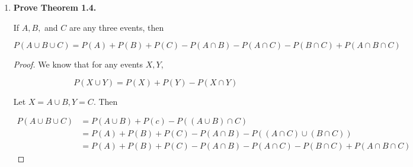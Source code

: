 \documentclass[10pt, oneside]{article}
\begin{document}
\begin{enumerate}[label=1.\arabic*]
\begin{enumerate}
	
	\item  \begin{tcolorbox}[
	  colback=Cerulean!5!white,
	  colframe=Cerulean!75!black]
	\textbf{Exactly one of the events occurs.}
	\end{tcolorbox}
	
	
	\item  \begin{tcolorbox}[
	  colback=Cerulean!5!white,
	  colframe=Cerulean!75!black]
	\textbf{Exactly two of the events occur.}
	\end{tcolorbox}
	
	
	\item  \begin{tcolorbox}[
	  colback=Cerulean!5!white,
	  colframe=Cerulean!75!black]
	\textbf{Not more than two of the events occur simultaneously.}
	\end{tcolorbox}
	
	\end{enumerate}

\item  \begin{tcolorbox}[
  colback=Cerulean!5!white,
  colframe=Cerulean!75!black]
\textbf{Prove Theorem 1.4.}
\end{tcolorbox}

\begin{thm}
If $A, B,$ and $C$ are any three events, then

\[ P(A \cup B \cup C) = P(A) + P(B) + P(C) - P(A \cap B) - P(A \cap C) - P(B \cap C) + P(A \cap B \cap C) \]
\end{thm}

\begin{proof}
We know that for any events $X,Y$,

\[ P(X \cup Y) = P(X) + P(Y) - P(X \cap Y) \]

Let $X = A \cup B, Y = C$. Then

\begin{align*}
P(A \cup B \cup C) &= P(A \cup B) + P(c) - P((A \cup B) \cap C) \\
&= P(A) + P(B) + P(C) - P(A \cap B) - P((A \cap C) \cup (B \cap C)) \\
&= P(A) + P(B) + P(C) - P(A \cap B) - P(A \cap C) - P(B \cap C) + P(A \cap B \cap C)
\end{align*}
\end{proof}


\end{enumerate}
\end{document}
